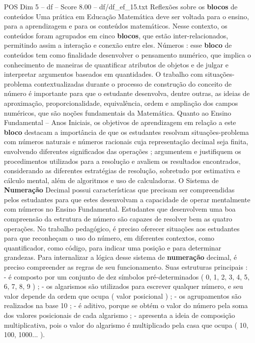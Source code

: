 \begin{textsample}{POS Dim 5 – df – Score 8.00 – df/df\_ef\_15.txt}  \label{ex:f5_pos_152}
Reflexões sobre os \textbf{blocos} de conteúdos Uma prática em Educação Matemática deve ser voltada para o ensino, para a aprendizagem e para os conteúdos matemáticos.
Nesse contexto, os conteúdos foram agrupados em cinco \textbf{blocos}, que estão inter-relacionados, permitindo assim a interação e conexão entre eles.
Números : esse \textbf{bloco} de conteúdos tem como finalidade desenvolver o pensamento numérico, que implica o conhecimento de maneiras de quantificar atributos de objetos e de julgar e interpretar argumentos baseados em quantidades.
O trabalho com situações-problema contextualizadas durante o processo de construção do conceito de número é importante para que o estudante desenvolva, dentre outras, as ideias de aproximação, proporcionalidade, equivalência, ordem e ampliação dos campos numéricos, que são noções fundamentais da Matemática.
Quanto ao Ensino Fundamental – Anos Iniciais, os objetivos de aprendizagem em relação a este \textbf{bloco} destacam a importância de que os estudantes resolvam situações-problema com números naturais e números racionais cuja representação decimal seja finita, envolvendo diferentes significados das operações ; argumentem e justifiquem os procedimentos utilizados para a resolução e avaliem os resultados encontrados, considerando as diferentes estratégias de resolução, sobretudo por estimativa e cálculo mental, além de algoritmos e uso de calculadoras.
O Sistema de \textbf{Numeração} Decimal possui características que precisam ser compreendidas pelos estudantes para que estes desenvolvam a capacidade de operar mentalmente com números no Ensino Fundamental.
Estudantes que desenvolvem uma boa compreensão da estrutura de número são capazes de resolver bem as quatro operações.
No trabalho pedagógico, é preciso oferecer situações aos estudantes para que reconheçam o uso do número, em diferentes contextos, como quantificador, como código, para indicar uma posição e para determinar grandezas.
Para internalizar a lógica desse sistema de \textbf{numeração} decimal, é preciso compreender as regras de seu funcionamento.
Suas estruturas principais : - é composto por um conjunto de dez símbolos pré-determinados ( 0, 1, 2, 3, 4, 5, 6, 7, 8, 9 ) ; - os algarismos são utilizados para escrever qualquer número, e seu valor depende da ordem que ocupa ( valor posicional ) ; - os agrupamentos são realizados na base 10 ; - é aditivo, porque se obtém o valor do número pela soma dos valores posicionais de cada algarismo ; - apresenta a ideia de composição multiplicativa, pois o valor do algarismo é multiplicado pela casa que ocupa ( 10, 100, 1000... ).

\end{textsample}
